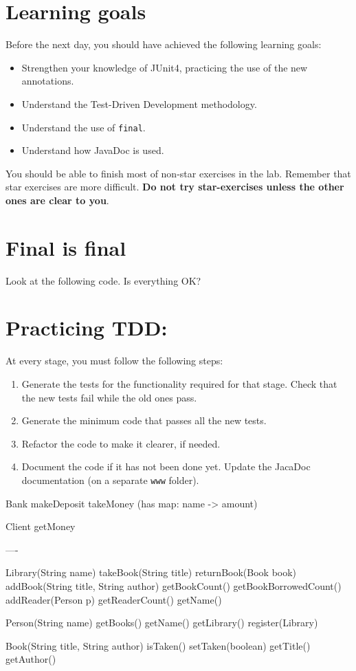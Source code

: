 \documentclass{article}
\begin{document}
\section*{Learning goals}
\label{sec:learning-goals}

Before the next day, you should have achieved the following learning
goals: 

\begin{itemize}
\item Strengthen your knowledge of JUnit4, practicing the use of the
  new annotations.
\item Understand the Test-Driven Development methodology. 
\item Understand the use of \verb+final+.
\item Understand how JavaDoc is used.
\end{itemize}

You should be able to finish most of non-star exercises in the lab. 
Remember that star exercises are more difficult. 
\textbf{Do not try star-exercises unless the other ones are clear to
  you}.  

\section{Final is final}
\label{sec:final-final}

Look at the following code. Is everything OK?



\section{Practicing TDD: }
\label{sec:jj}

At every stage, you must follow the following steps: 

\begin{enumerate}
\item Generate the tests for the functionality required for that
  stage. Check that the new tests fail while the old ones pass.
\item Generate the minimum code that passes all the new tests.
\item Refactor the code to make it clearer, if needed.
\item Document the
  code if it has not been done yet. Update the JacaDoc documentation
  (on a separate \verb+www+ folder). 
\end{enumerate}

Bank
  makeDeposit
  takeMoney
  (has map: name -> amount)

Client
  getMoney

----
  
Library(String name)
  takeBook(String title)
  returnBook(Book book)
  addBook(String title, String author)
  getBookCount()
  getBookBorrowedCount()
  addReader(Person p)
  getReaderCount()
  getName()

Person(String name)
  getBooks() 
  getName()
  getLibrary()
  register(Library)

Book(String title, String author)
  isTaken()
  setTaken(boolean)
  getTitle()
  getAuthor()
\end{document}
